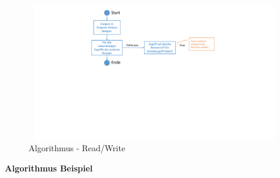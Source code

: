 \documentclass[10pt,a4paper]{article}
\begin{document}
\begin{flushleft}
\begin{figure}[H]
\centering
	\includegraphics[width=14cm,height=6cm,trim=70mm 100mm 80mm 7mm, clip]{images/ReadWrite.pdf}
\caption{Algorithmus - Read/Write}\label{algo_readwrite}
\end{figure}
\end{flushleft}
\textbf{Algorithmus Beispiel}
\end{document}
